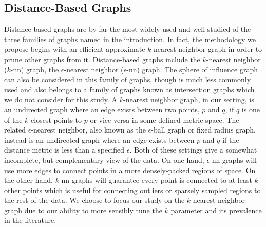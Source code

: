 \subsection{Distance-Based Graphs}
Distance-based graphs are by far the most widely used and well-studied of the three families of graphs named in the introduction.
%
In fact, the methodology we propose begins with an efficient approximate $k$-nearest neighbor graph in order to prune other graphs from it.
%
Distance-based graphs include the $k$-nearest neighbor ($k$-nn) graph, the $\epsilon$-nearest neighbor ($\epsilon$-nn) graph.
%
The sphere of influence graph~\cite{Toussaint1988} can also be considered in this family of graphs, though is much less commonly used and also belongs to a family of graphs known as intersection graphs which we do not consider for this study.
%
A $k$-nearest neighbor graph, in our setting, is an undirected graph where an edge exists between two points, $p$ and $q$, if $q$ is one of the $k$ closest points to $p$ or vice versa in some defined metric space.
%
The related $\epsilon$-nearest neighbor, also known as the $\epsilon$-ball graph or fixed radius graph, instead is an undirected graph where an edge exists between $p$ and $q$ if the distance metric is less than a specified $\epsilon$.
%
Both of these settings give a somewhat incomplete, but complementary view of the data.
%
On one-hand, $\epsilon$-nn graphs will use more edges to connect points in a more densely-packed regions of space.
%
On the other hand, $k$-nn graphs will guarantee every point is connected to at least $k$ other points which is useful for connecting outliers or sparsely sampled regions to the rest of the data.
%
We choose to focus our study on the $k$-nearest neighbor graph due to our ability to more sensibly tune the $k$ parameter and its prevalence in the literature.

